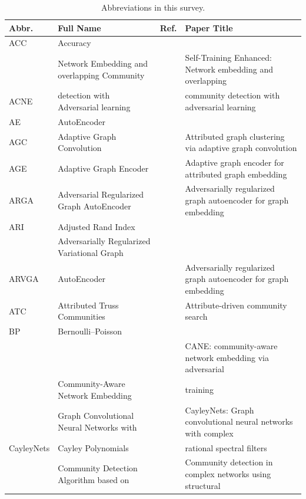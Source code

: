 \label{sec-abbr}
\begin{table}[h]
\centering \footnotesize
\renewcommand\arraystretch{1.2}
\caption{Abbreviations in this survey.}
\begin{tabular}{llll}
\toprule[1pt]
\textbf{Abbr.} & \textbf{Full Name} & \textbf{Ref.} & \textbf{Paper Title} \\ \midrule
\rowcolor{gray!30}
ACC & Accuracy & & \\
& Network Embedding and overlapping Community & & Self-Training Enhanced: Network embedding and overlapping  \\ 
\multirow{-2}{*}{ACNE} & detection with Adversarial learning & \multirow{-2}{*}{} & community detection with adversarial learning \\
\rowcolor{gray!30}
AE & AutoEncoder &  &  \\
AGC & Adaptive Graph Convolution &  & Attributed graph clustering via adaptive graph convolution \\
\rowcolor{gray!30}
AGE & Adaptive Graph Encoder &  & Adaptive graph encoder for attributed graph embedding \\
ARGA & Adversarial Regularized Graph AutoEncoder &  & Adversarially regularized graph autoencoder for graph embedding \\ 
\rowcolor{gray!30}
ARI & Adjusted Rand Index &  &  \\
& Adversarially Regularized Variational Graph & & \\
\multirow{-2}{*}{ARVGA} & AutoEncoder & \multirow{-2}{*}{} & \multirow{-2}{*}{Adversarially regularized graph autoencoder for graph embedding} \\
\rowcolor{gray!30}
ATC & Attributed Truss Communities &  & Attribute-driven community search \\ \midrule
BP & Bernoulli--Poisson & & \\ \midrule
\rowcolor{gray!30}
& & & CANE: community-aware network embedding via adversarial \\
\rowcolor{gray!30}
\multirow{-2}{*}{CANE} & \multirow{-2}{*}{Community-Aware Network Embedding} & \multirow{-2}{*}{} & training \\
& Graph Convolutional Neural Networks with & & CayleyNets: Graph convolutional neural networks with complex \\ 
\multirow{-2}{*}{CayleyNets} & Cayley Polynomials & \multirow{-2}{*}{} & rational spectral filters \\ 
\rowcolor{gray!30}
& Community Detection Algorithm based on  &  & Community detection in complex networks using structural \\

\end{tabular}
\end{table}

